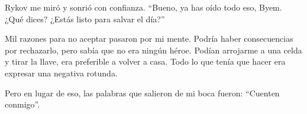 Rykov me miró y sonrió con confianza. “Bueno, ya has oído todo eso, Byem. ¿Qué dices? ¿Estás listo para salvar el día?”

Mil razones para no aceptar pasaron por mi mente. Podría haber consecuencias por rechazarlo, pero sabía que no era ningún héroe. Podían arrojarme a una celda y tirar la llave, era preferible a volver a casa. Todo lo que tenía que hacer era expresar una negativa rotunda.

Pero en lugar de eso, las palabras que salieron de mi boca fueron: “Cuenten conmigo”.